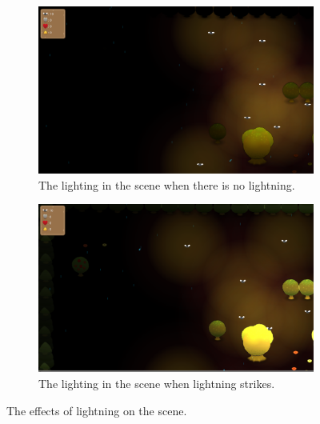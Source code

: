 \begin{figure}[h]
        \centering
        \begin{subfigure}[b]{0.492\linewidth}
                \includegraphics[width=\linewidth]{./no_lightning}
                \caption{The lighting in the scene when there is no lightning.}
                \label{fig:lightning}
        \end{subfigure}
        \begin{subfigure}[b]{0.49\linewidth}
                \includegraphics[width=\linewidth]{./lightning}
                \caption{The lighting in the scene when lightning strikes.}
                \label{fig:no_lightning}
        \end{subfigure}
        \caption{The effects of lightning on the scene.}
        \label{fig:lightning_compare}
\end{figure}
